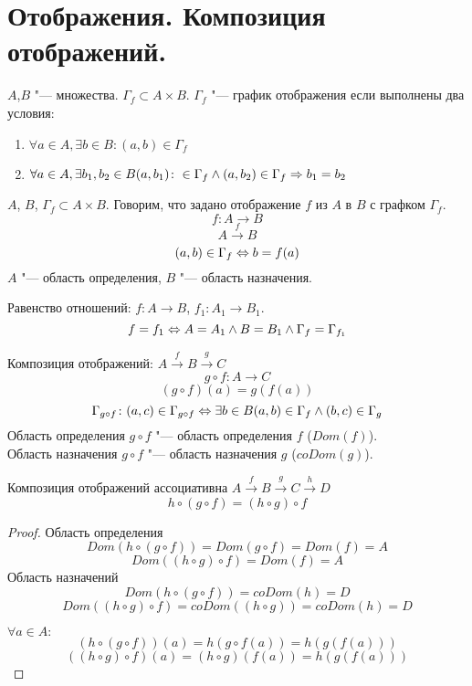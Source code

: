 ﻿\section{Отображения. Композиция отображений.}

\begin{Def}
$A$,$B$ "--- множества. $\Gamma_{f} \subset A \times B$. $\Gamma_{f}$ "--- график отображения если выполнены два условия:
\begin{enumerate}
\item $\forall a \in A, \exists b \in B\colon (a, b) \in \Gamma_{f}$
\item $\forall a \in A, \exists b_1, b_2 \in B (a, b_1)\colon \in \Gamma_f \wedge (a, b_2) \in \Gamma_f \Rightarrow b_1 = b_2$
\end{enumerate} 
\end{Def}

\begin{Def}
$A$, $B$, $\Gamma_f \subset A \times B$. Говорим, что задано отображение $f$ из $A$ в $B$ с графком $\Gamma_f$.
$$f:A \to B$$
$$A \xrightarrow{f} B$$
$$(a, b) \in \Gamma_f \Leftrightarrow b = f(a)$$
$A$ "--- область определения, $B$ "--- область назначения.
\end{Def}

\begin{Def}
Равенство отношений: $f: A \to B$, $f_1: A_1 \to B_1$.
$$f = f_1 \Leftrightarrow A = A_1 \land B = B_1 \land \Gamma_f = \Gamma_{f_1}$$
\end{Def}

\begin{Def}
Композиция отображений: $A \xrightarrow{f} B \xrightarrow{g} C$
$$g \circ f: A \to C$$
$$(g \circ f)(a) = g(f(a))$$
$$\Gamma_{g \circ f}\colon (a, c) \in \Gamma_{g \circ f} \Leftrightarrow \exists b \in B (a, b) \in \Gamma_{f} \wedge (b, c) \in \Gamma_g$$
Область определения $g \circ f$ "--- область определения $f$ ($Dom(f)$). \\
Область назначения $g \circ f$ "--- область назначения $g$ ($coDom(g)$).
\end{Def}

\begin{theorem}{Композиция отображений ассоциативна}
$ A \xrightarrow{f} B \xrightarrow{g} C \xrightarrow{h} D $
$$h \circ (g \circ f) = (h \circ g) \circ f $$
\end{theorem}

\begin{proof}
Область определения 
$$Dom(h \circ (g \circ f)) = Dom(g \circ f) = Dom(f) = A$$
$$Dom((h \circ g) \circ f) = Dom(f) = A$$
Область назначений 
$$Dom(h \circ (g \circ f)) = coDom(h) = D$$
$$Dom((h \circ g) \circ f) = coDom((h \circ g)) = coDom(h) = D$$

$\forall a \in A\colon$
$$(h \circ (g \circ f))(a) = h(g \circ f(a)) = h(g(f(a)))$$
$$((h \circ g) \circ f)(a) = (h \circ g)(f(a)) = h(g(f(a)))$$     
\end{proof}
